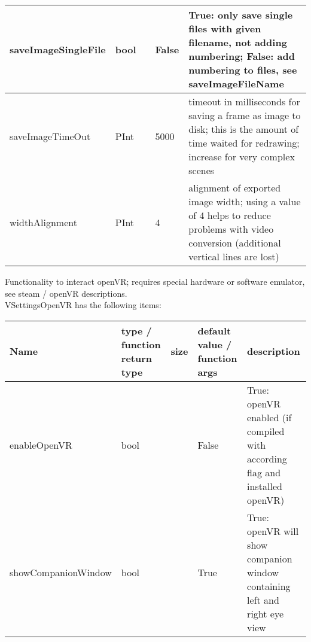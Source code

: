 \begin{center}
\begin{longtable}{| p{4.2cm} | p{2.5cm} | p{0.3cm} | p{3.0cm} | p{6cm} |}
    saveImageSingleFile &     bool &      &     False &     True: only save single files with given filename, not adding numbering; False: add numbering to files, see saveImageFileName\\ \hline
    saveImageTimeOut &     PInt &      &     5000 &     timeout in milliseconds for saving a frame as image to disk; this is the amount of time waited for redrawing; increase for very complex scenes\\ \hline
    widthAlignment &     PInt &      &     4 &     alignment of exported image width; using a value of 4 helps to reduce problems with video conversion (additional vertical lines are lost)\\ \hline
	  \end{longtable}
	\end{center}

 \label{sec:VSettingsOpenVR}
Functionality to interact openVR; requires special hardware or software emulator, see steam / openVR descriptions. \\ 
%
VSettingsOpenVR has the following items:
\begin{center}
  \footnotesize
  \begin{longtable}{| p{4.2cm} | p{2.5cm} | p{0.3cm} | p{3.0cm} | p{6cm} |}
    \hline
    \bf Name & \bf type / function return type & \bf size & \bf default value / function args & \bf description \\ \hline
    enableOpenVR &     bool &      &     False &     True: openVR enabled (if compiled with according flag and installed openVR)\\ \hline
    showCompanionWindow &     bool &      &     True &     True: openVR will show companion window containing left and right eye view\\ \hline
	  \end{longtable}
	\end{center}

